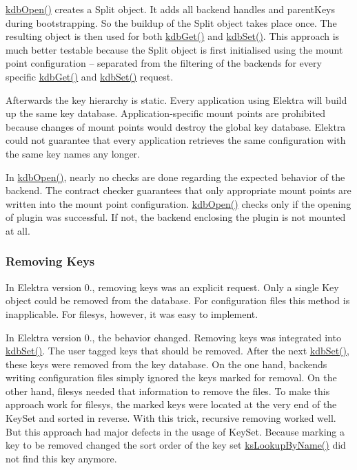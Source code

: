 {\ttfamily \hyperlink{group__kdb_ga6808defe5870f328dd17910aacbdc6ca}{kdb\+Open()}} creates a {\ttfamily Split} object. It adds all backend handles and {\ttfamily parent\+Keys} during bootstrapping. So the buildup of the {\ttfamily Split} object takes place once. The resulting object is then used for both {\ttfamily \hyperlink{group__kdb_ga28e385fd9cb7ccfe0b2f1ed2f62453a1}{kdb\+Get()}} and {\ttfamily \hyperlink{group__kdb_ga11436b058408f83d303ca5e996832bcf}{kdb\+Set()}}. This approach is much better testable because the {\ttfamily Split} object is first initialised using the mount point configuration -- separated from the filtering of the backends for every specific {\ttfamily \hyperlink{group__kdb_ga28e385fd9cb7ccfe0b2f1ed2f62453a1}{kdb\+Get()}} and {\ttfamily \hyperlink{group__kdb_ga11436b058408f83d303ca5e996832bcf}{kdb\+Set()}} request.

Afterwards the key hierarchy is static. Every application using Elektra will build up the same key database. Application-\/specific mount points are prohibited because changes of mount points would destroy the global key database. Elektra could not guarantee that every application retrieves the same configuration with the same key names any longer.

In {\ttfamily \hyperlink{group__kdb_ga6808defe5870f328dd17910aacbdc6ca}{kdb\+Open()}}, nearly no checks are done regarding the expected behavior of the backend. The contract checker guarantees that only appropriate mount points are written into the mount point configuration. {\ttfamily \hyperlink{group__kdb_ga6808defe5870f328dd17910aacbdc6ca}{kdb\+Open()}} checks only if the opening of plugin was successful. If not, the backend enclosing the plugin is not mounted at all.

\subsubsection*{Removing Keys}

In Elektra version 0., removing keys was an explicit request. Only a single {\ttfamily Key} object could be removed from the database. For configuration files this method is inapplicable. For {\ttfamily filesys}, however, it was easy to implement.

In Elektra version 0., the behavior changed. Removing keys was integrated into {\ttfamily \hyperlink{group__kdb_ga11436b058408f83d303ca5e996832bcf}{kdb\+Set()}}. The user tagged keys that should be removed. After the next {\ttfamily \hyperlink{group__kdb_ga11436b058408f83d303ca5e996832bcf}{kdb\+Set()}}, these keys were removed from the key database. On the one hand, backends writing configuration files simply ignored the keys marked for removal. On the other hand, {\ttfamily filesys} needed that information to remove the files. To make this approach work for {\ttfamily filesys}, the marked keys were located at the very end of the {\ttfamily Key\+Set} and sorted in reverse. With this trick, recursive removing worked well. But this approach had major defects in the usage of {\ttfamily Key\+Set}. Because marking a key to be removed changed the sort order of the key set {\ttfamily \hyperlink{group__keyset_gad2e30fb6d4739d917c5abb2ac2f9c1a1}{ks\+Lookup\+By\+Name()}} did not find this key anymore.

